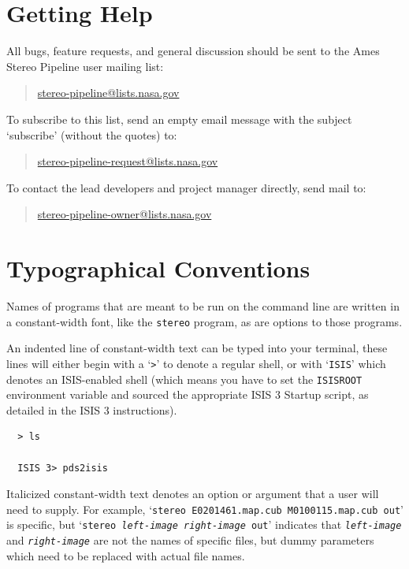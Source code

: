 %
%
%
%

\pagebreak
\section{Getting Help}

All bugs, feature requests, and general discussion should be sent to
the Ames Stereo Pipeline user mailing list:
\begin{quote}
\indent \href{mailto:stereo-pipeline@lists.nasa.gov}{stereo-pipeline@lists.nasa.gov}
\end{quote}
To subscribe to this list, send an empty email message with the
subject `subscribe' (without the quotes) to:
\begin{quote}
\indent \href{mailto:stereo-pipeline-request@lists.nasa.gov}{stereo-pipeline-request@lists.nasa.gov}
\end{quote}
To contact the lead developers and project manager directly, send mail
to:
\begin{quote}
\indent \href{mailto:stereo-pipeline-owner@lists.nasa.gov}{stereo-pipeline-owner@lists.nasa.gov}
\end{quote}

\section{Typographical Conventions}

Names of programs that are meant to be run on the command line are
written in a constant-width font, like the \texttt{stereo} program,
as are options to those programs.

An indented line of constant-width text can be typed into your
terminal, these lines will either begin with a `\texttt{>}' to
denote a regular shell, or with `\texttt{ISIS}' which denotes an
\ac{ISIS}-enabled shell (which means you have to set the \texttt{ISISROOT}
environment variable and sourced the appropriate \ac{ISIS} 3 Startup
script, as detailed in the \ac{ISIS} 3 instructions).
\begin{verbatim}
  > ls

  ISIS 3> pds2isis
\end{verbatim}

Italicized constant-width text denotes an option or argument that
a user will need to supply.  For example, `\texttt{stereo E0201461.map.cub
M0100115.map.cub out}' is specific, but `\texttt{stereo \textit{left-image
right-image} out}' indicates that \texttt{\textit{left-image}} and
\texttt{\textit{right-image}} are not the names of specific files,
but dummy parameters which need to be replaced with actual file
names.

